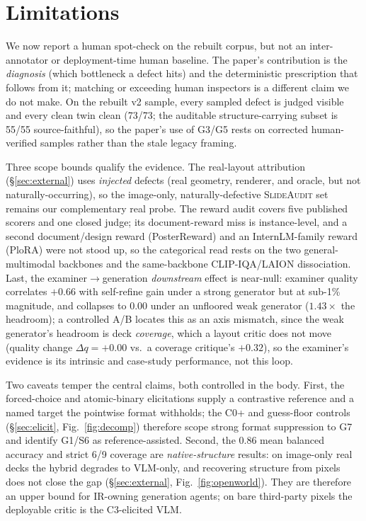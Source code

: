 \documentclass[10pt]{article}
\newcommand{\g}[1]{\textsf{#1}}        %
\begin{document}
\section{Limitations}\label{sec:limits}

We now report a human spot-check on the rebuilt corpus, but not an inter-annotator or deployment-time human
baseline. The paper's contribution is the \emph{diagnosis} (which bottleneck a defect hits) and the deterministic prescription
that follows from it; matching or exceeding human inspectors is a different claim we do not make. On the
rebuilt v2 sample, every sampled defect is judged visible and every clean twin clean (73/73; the auditable
structure-carrying subset is 55/55 source-faithful), so the paper's use of \g{G3}/\g{G5} rests on corrected
human-verified samples rather than the stale legacy framing.

Three scope bounds qualify the evidence. The real-layout attribution (\S\ref{sec:external}) uses \emph{injected}
defects (real geometry, renderer, and oracle, but not naturally-occurring), so the image-only,
naturally-defective \textsc{SlideAudit} set remains our complementary real probe. The reward audit covers five
published scorers and one closed judge; its document-reward miss is instance-level, and a second document/design
reward (PosterReward) and an InternLM-family reward (PloRA) were not stood up, so the categorical read rests on
the two general-multimodal backbones and the same-backbone CLIP-IQA/LAION dissociation. Last, the
examiner$\to$generation \emph{downstream} effect is near-null: examiner quality correlates $+0.66$ with
self-refine gain under a strong generator but at sub-1\% magnitude, and collapses to $0.00$ under an unfloored
weak generator ($1.43\times$ the headroom); a controlled A/B locates this as an axis mismatch, since the weak
generator's headroom is deck \emph{coverage}, which a layout critic does not move (quality change
$\Delta q{=}{+}0.00$ vs.\ a coverage critique's ${+}0.32$), so the examiner's evidence is its intrinsic and
case-study performance, not this loop.

Two caveats temper the central claims, both controlled in the body. First, the forced-choice and atomic-binary
elicitations supply a contrastive reference and a named target the pointwise format withholds; the C0+ and
guess-floor controls (\S\ref{sec:elicit}, Fig.~\ref{fig:decomp}) therefore scope strong format suppression to
\g{G7} and identify \g{G1}/\g{S6} as reference-assisted. Second, the 0.86 mean balanced accuracy and strict
6/9 coverage are \emph{native-structure} results: on image-only real decks the hybrid degrades to VLM-only,
and recovering structure from pixels does not close the gap (\S\ref{sec:external}, Fig.~\ref{fig:openworld}).
They are therefore an upper bound for IR-owning generation agents; on bare third-party pixels the deployable
critic is the C3-elicited VLM.
\end{document}
